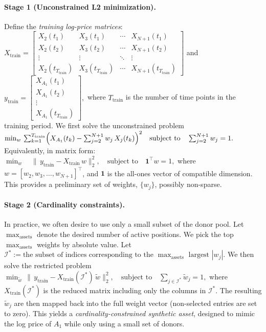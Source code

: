 \paragraph{Stage 1 (Unconstrained L2 minimization).}
Define the \emph{training log-price matrices}:
$
X_{\text{train}} = 
\begin{bmatrix}
X_{2}(t_1) & X_{3}(t_1) & \cdots & X_{N+1}(t_1) \\
X_{2}(t_2) & X_{3}(t_2) & \cdots & X_{N+1}(t_2) \\
\vdots & \vdots & \ddots & \vdots \\
X_{2}(t_{T_{\text{train}}}) & X_{3}(t_{T_{\text{train}}}) & \cdots & X_{N+1}(t_{T_{\text{train}}})
\end{bmatrix}
$
and
$
y_{\text{train}} = 
\begin{bmatrix}
X_{A_1}(t_1) \\
X_{A_1}(t_2) \\
\vdots \\
X_{A_1}(t_{T_{\text{train}}})
\end{bmatrix},
$
where $T_{\text{train}}$ is the number of time points in the training period. We first solve the unconstrained problem
$
\min_w \, \sum_{k=1}^{T_{\text{train}}} \Bigl(X_{A_1}(t_k) - \sum_{j=2}^{N+1} w_j \,X_{j}(t_k)\Bigr)^2 
\quad 
\text{subject to} \quad 
\sum_{j=2}^{N+1} w_j = 1.
$
Equivalently, in matrix form:
$
\min_{w} \quad \|\,y_{\text{train}} - X_{\text{train}}\,w\|_2^2,\quad \text{subject to} \quad \mathbf{1}^\top w = 1,
$
where $w = [w_2, w_3, \ldots, w_{N+1}]^\top$, and $\mathbf{1}$ is the all-ones vector of compatible dimension. This provides a preliminary set of weights, $\{w_j\}$, possibly non-sparse.

\paragraph{Stage 2 (Cardinality constraints).}
In practice, we often desire to use only a small subset of the donor pool. Let $\max_{\text{assets}}$ denote the desired number of active positions. We pick the top $\max_{\text{assets}}$ weights by absolute value. Let 
$
\mathcal{I}^{\ast} := 
\text{the subset of indices corresponding to the $\max_{\text{assets}}$ largest $|w_j|$}.
$
We then solve the restricted problem
$
\min_
{\tilde{w}}
\,\|\,y_{\text{train}} - X_{\text{train}}(\mathcal{I}^{\ast})\,\tilde{w}\|_2^2,\quad
\text{subject to}
\quad 
\sum_{j \in \mathcal{I}^{\ast}} \tilde{w}_j = 1,
$
where $X_{\text{train}}(\mathcal{I}^{\ast})$ is the reduced matrix including only the columns in $\mathcal{I}^{\ast}$. The resulting $\tilde{w}_j$ are then mapped back into the full weight vector (non-selected entries are set to zero). This yields a \emph{cardinality-constrained synthetic asset}, designed to mimic the log price of $A_1$ while only using a small set of donors.

